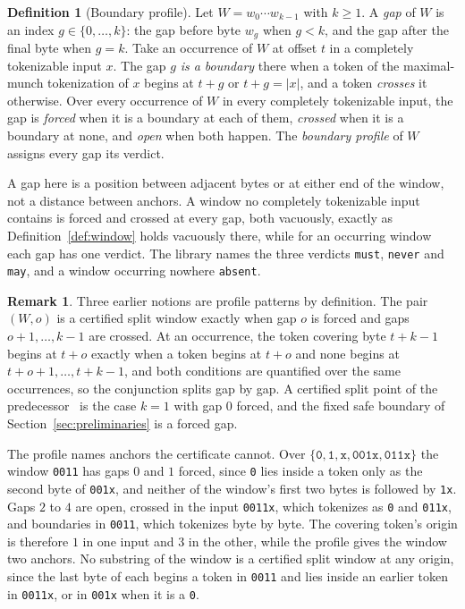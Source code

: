 \documentclass[11pt,a4paper]{article}
\theoremstyle{definition}
\newtheorem{definition}{Definition}
\newtheorem{remark}{Remark}
\theoremstyle{plain}
\newcommand{\code}[1]{\texttt{#1}}
\begin{document}
\begin{definition}[Boundary profile]
\label{def:profile}
Let $W = w_0 \cdots w_{k-1}$ with $k \geq 1$. A \emph{gap} of $W$ is an index $g \in \{0, \ldots, k\}$: the gap before
byte $w_g$ when $g < k$, and the gap after the final byte when $g = k$. Take an occurrence of $W$ at offset $t$ in a
completely tokenizable input $x$. The gap $g$ \emph{is a boundary} there when a token of the maximal-munch tokenization
of $x$ begins at $t + g$ or $t + g = |x|$, and a token \emph{crosses} it otherwise. Over every occurrence of $W$ in
every completely tokenizable input, the gap is \emph{forced} when it is a boundary at each of them, \emph{crossed} when
it is a boundary at none, and \emph{open} when both happen. The \emph{boundary profile} of $W$ assigns every gap its
verdict.
\end{definition}

A gap here is a position between adjacent bytes or at either end of the window, not a distance between anchors. A window
no completely tokenizable input contains is forced and crossed at every gap, both vacuously, exactly as
Definition~\ref{def:window} holds vacuously there, while for an occurring window each gap has one verdict. The library
names the three verdicts \code{must}, \code{never} and \code{may}, and a window occurring nowhere \code{absent}.

\begin{remark}
\label{rem:profile}
Three earlier notions are profile patterns by definition. The pair $(W, o)$ is a certified split window exactly when gap
$o$ is forced and gaps $o + 1, \ldots, k - 1$ are crossed. At an occurrence, the token covering byte $t + k - 1$ begins
at $t + o$ exactly when a token begins at $t + o$ and none begins at $t + o + 1, \ldots, t + k - 1$, and both conditions
are quantified over the same occurrences, so the conjunction splits gap by gap. A certified split point of the
predecessor~\cite{nidhogg2026splitpoints} is the case $k = 1$ with gap $0$ forced, and the fixed safe boundary of
Section~\ref{sec:preliminaries} is a forced gap.
\end{remark}

The profile names anchors the certificate cannot. Over $\{\code{0}, \code{1}, \code{x}, \code{001x}, \code{011x}\}$ the
window \code{0011} has gaps $0$ and $1$ forced, since \code{0} lies inside a token only as the second byte of
\code{001x}, and neither of the window's first two bytes is followed by \code{1x}. Gaps $2$ to $4$ are open, crossed in
the input \code{0011x}, which tokenizes as \code{0} and \code{011x}, and boundaries in \code{0011}, which tokenizes byte
by byte. The covering token's origin is therefore $1$ in one input and $3$ in the other, while the profile gives the
window two anchors. No substring of the window is a certified split window at any origin, since the last byte of each
begins a token in \code{0011} and lies inside an earlier token in \code{0011x}, or in \code{001x} when it is a \code{0}.
\end{document}
